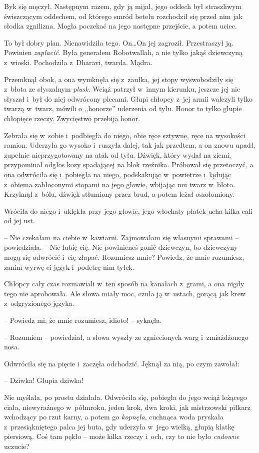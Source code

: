 \documentclass[oneside,polish,11pt,rmheadings]{mwbk}
\begin{document}
Byk się męczył. Następnym razem, gdy ją mijał, jego oddech był straszliwym świszczącym oddechem, od którego smród betelu rozchodził się przed nim jak słodka zgnilizna. Mogła poczekać na jego następne przejście, a potem uciec. 


To był dobry plan. Nienawidziła tego. On\ldots  On jej zagroził. Przestraszył ją. Powinien \textit{zapłacić}. Była generałem Robotwallah, a nie tylko jakąś dziewczyną z~wioski. Pochodziła z~Dharavi, twarda. Mądra. 


Przemknął obok, a ona wymknęła się z~zaułka, jej stopy wyswobodziły się z~błota ze słyszalnym \textit{plusk}. Wciąż patrzył w~innym kierunku, jeszcze jej nie słyszał i~był do niej odwrócony plecami. Głupi chłopcy z~jej armii walczyli tylko twarzą w~twarz, mówili o ,,honorze'' uderzenia od tyłu. Honor to tylko głupie chłopięce rzeczy. Zwycięstwo przebija honor. 


Zebrała się w~sobie i~podbiegła do niego, obie ręce sztywne, ręce na wysokości ramion. Uderzyła go wysoko i~ruszyła dalej, tak jak przedtem, a on znowu upadł, zupełnie nieprzygotowany na atak od tyłu. Dźwięk, który wydał na ziemi, przypominał odgłos kozy spadającej na blok rzeźnika. Próbował się przetoczyć, a ona odwróciła się i~pobiegła na niego, podskakując w~powietrze i~lądując z~obiema zabłoconymi stopami na jego głowie, wbijając mu twarz w~błoto. Krzyknął z~bólu, dźwięk stłumiony przez brud, a potem leżał oszołomiony. 


Wróciła do niego i~uklękła przy jego głowie, jego włochaty płatek ucha kilka cali od jej ust. 


-- Nie czekałam na ciebie w~kawiarni. Zajmowałam się własnymi sprawami -- powiedziała. -- Nie lubię cię. Nie powinieneś gonić dziewczyn, bo dziewczyny mogą się odwrócić i~cię złapać. Rozumiesz mnie? Powiedz, że mnie rozumiesz, zanim wyrwę ci język i~podetrę nim tyłek. 

Chłopcy cały czas rozmawiali w~ten sposób na kanałach z~grami, a ona nigdy tego nie aprobowała. Ale słowa miały moc, czuła ją w~ustach, gorącą jak krew z~odgryzionego języka. 


-- Powiedz mi, że mnie rozumiesz, idioto! -- syknęła. 


-- Rozumiem -- powiedział, a słowa wyszły ze zgniecionych warg i~zmiażdżonego nosa. 


Odwróciła się na pięcie i~zaczęła odchodzić. Jęknął za nią, po czym zawołał: 

-- Dziwka! Głupia dziwka! 


Nie myślała, po prostu działała. Odwróciła się, pobiegła do jego wciąż leżącego ciała, niewyraźnego w~półmroku, jeden krok, dwa kroki, jak mistrzowski piłkarz wchodzący po rzut karny, a potem go \textit{kopnęła}, cuchnąca woda pryskała z~przesiąkniętego palca jej buta, gdy uderzyła w~jego wielką, głupią klatkę piersiową. Coś tam pękło -- może kilka rzeczy i~och, czy to nie było \textit{cudowne} uczucie? 
\end{document}
